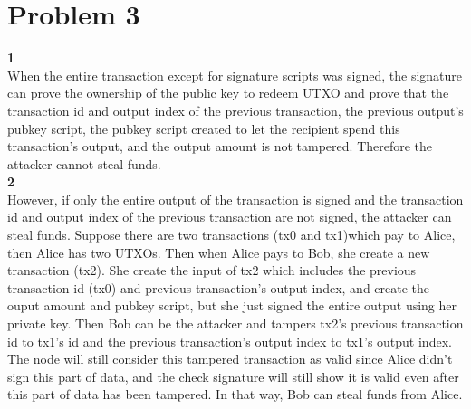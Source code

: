\documentclass[latterpaper]{article}
\newcommand\blankpage{%
    \null
    \thispagestyle{empty}%
    \addtocounter{page}{-1}%
    \newpage}
\begin{document}
\pagebreak
\section*{Problem 3}
{\bf 1} \\
When the entire transaction except for signature scripts was signed, the signature can prove the ownership of the public key to redeem UTXO and prove that the transaction id and output index of the previous transaction, the previous output's pubkey script, the pubkey script  created to let the recipient spend this transaction's output, and the output amount is not tampered. Therefore the attacker cannot steal funds. \\
{\bf 2} \\
However, if only the entire output of the transaction is signed and the transaction id and output index of the previous transaction are not signed, the attacker can steal funds. Suppose there are two transactions (tx0 and tx1)which pay to Alice, then Alice has two UTXOs. Then when Alice pays to Bob, she create a new transaction (tx2). She create the input of tx2 which includes the previous transaction id (tx0) and previous transaction's output index, and create the ouput amount and pubkey script, but she just signed the entire output using her private key. Then Bob can be the attacker and tampers tx2's previous transaction id to tx1's id and the previous transaction's output index to tx1's output index. The node will still consider this tampered transaction as valid since Alice didn't sign this part of data, and the check signature will still show it is valid even after this part of data has been tampered. In that way, Bob can steal funds from Alice. \\
\end{document}
